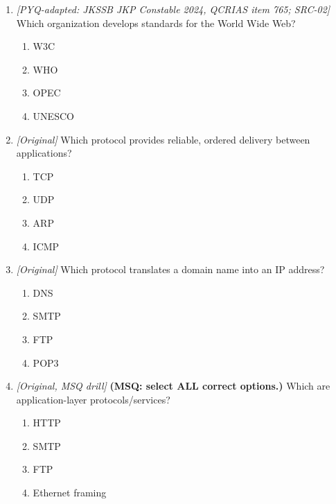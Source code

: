 \begin{enumerate}[label=\textbf{Q\arabic*.}, leftmargin=*]
\item \textit{[PYQ-adapted: JKSSB JKP Constable 2024, QCRIAS item 765; SRC-02]} Which organization develops standards for the World Wide Web?
  \begin{enumerate}[label=\Alph*.]
\item W3C
   \item WHO
   \item OPEC
   \item UNESCO
  \end{enumerate}

\item \textit{[Original]} Which protocol provides reliable, ordered delivery between applications?
  \begin{enumerate}[label=\Alph*.]
\item TCP
   \item UDP
   \item ARP
   \item ICMP
  \end{enumerate}

\item \textit{[Original]} Which protocol translates a domain name into an IP address?
  \begin{enumerate}[label=\Alph*.]
\item DNS
   \item SMTP
   \item FTP
   \item POP3
  \end{enumerate}

\item \textit{[Original, MSQ drill]} \textbf{(MSQ: select ALL correct options.)} Which are application-layer protocols/services?
  \begin{enumerate}[label=\Alph*.]
\item HTTP
   \item SMTP
   \item FTP
   \item Ethernet framing
  \end{enumerate}

\end{enumerate}
